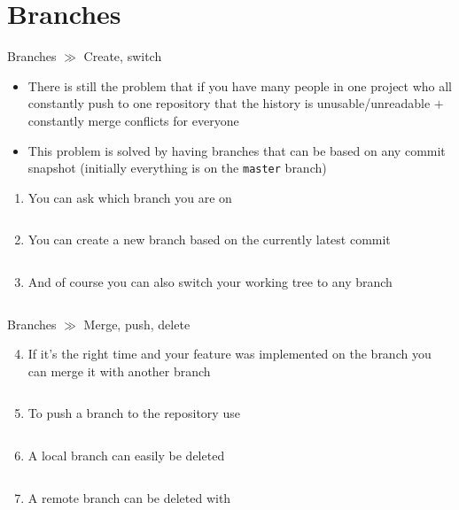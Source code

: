 \documentclass[10pt]{beamer}
\begin{document}
\section{Branches}

\begin{frame}{Branches $\gg$ Create, switch}
	\begin{itemize}
		\item There is still the problem that if you have many people in one project who all constantly push to one repository that the history is unusable/unreadable $+$ constantly merge conflicts for everyone
		\item This problem is solved by having branches that can be based on any commit snapshot (initially everything is on the \texttt{master} branch)
	\end{itemize}
	\begin{enumerate}
		\item You can ask which branch you are on
		\inputminted[bgcolor=lightGreyCustom,fontsize=\scriptsize]{sh}{./resources/git_branches_01_branch.sh}
		\item You can create a new branch based on the currently latest commit
		\inputminted[bgcolor=lightGreyCustom,fontsize=\scriptsize]{sh}{./resources/git_branches_02_create.sh}
		\item And of course you can also switch your working tree to any branch
		\inputminted[bgcolor=lightGreyCustom,fontsize=\scriptsize]{sh}{./resources/git_branches_03_checkout.sh}
	\end{enumerate}
\end{frame}

\begin{frame}{Branches $\gg$ Merge, push, delete}
	\begin{enumerate}\setcounter{enumi}{3}
		\item If it's the right time and your feature was implemented on the branch you can merge it with another branch
		\inputminted[bgcolor=lightGreyCustom,fontsize=\scriptsize]{sh}{./resources/git_branches_04_merge.sh}
		\item To push a branch to the repository use
		\inputminted[bgcolor=lightGreyCustom,fontsize=\scriptsize]{sh}{./resources/git_branches_05_push.sh}
		\item A local branch can easily be deleted
		\inputminted[bgcolor=lightGreyCustom,fontsize=\scriptsize]{sh}{./resources/git_branches_06_delete.sh}
		\item A remote branch can be deleted with
		\inputminted[bgcolor=lightGreyCustom,fontsize=\scriptsize]{sh}{./resources/git_branches_07_delete_remote.sh}
	\end{enumerate}
\end{frame}
\end{document}
